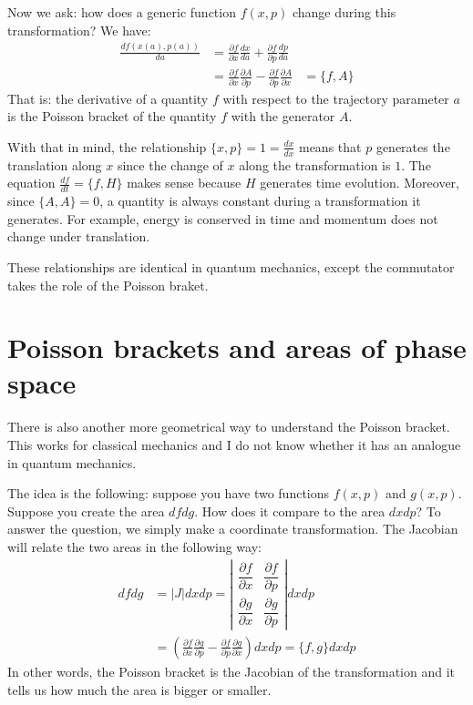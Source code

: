 \documentclass[aps,pra,10pt,floatfix,nofootinbib]{revtex4-1}
\theoremstyle{definition}
\begin{document}
Now we ask: how does a generic function $f(x,p)$ change during this transformation? We have:
\begin{equation}
\begin{aligned}
\frac{df(x(a),p(a))}{da} &= \frac{\partial f}{\partial x}\frac{dx}{da} + \frac{\partial f}{\partial p}\frac{dp}{da} \\
&=\frac{\partial f}{\partial x} \frac{\partial A}{\partial p} - \frac{\partial f}{\partial p}\frac{\partial A}{\partial x}
&=\{f,A\}
\end{aligned}
\label{PoissonGenerator}
\end{equation}
That is: the derivative of a quantity $f$ with respect to the trajectory parameter $a$ is the Poisson bracket of the quantity $f$ with the generator $A$.

With that in mind, the relationship $\{x, p\} = 1 = \frac{dx}{dx}$ means that $p$ generates the translation along $x$ since the change of $x$ along the transformation is $1$. The equation $\frac{df}{dt} = \{f, H\}$ makes sense because $H$ generates time evolution. Moreover, since $\{A, A\} = 0$, a quantity is always constant during a transformation it generates. For example, energy is conserved in time and momentum does not change under translation.

These relationships are identical in quantum mechanics, except the commutator takes the role of the Poisson braket.

\section{Poisson brackets and areas of phase space}

There is also another more geometrical way to understand the Poisson bracket. This works for classical mechanics and I do not know whether it has an analogue in quantum mechanics.

The idea is the following: suppose you have two functions $f(x,p)$ and $g(x,p)$. Suppose you create the area $df dg$. How does it compare to the area $dx dp$? To answer the question, we simply make a coordinate transformation. The Jacobian will relate the two areas in the following way:
\begin{equation}
\begin{aligned}
df dg &= | J | dx dp = \left| \begin{matrix}
\dfrac{\partial f}{\partial x} & \dfrac{\partial f}{\partial p} \\[2.2ex]
\dfrac{\partial g}{\partial x} & \dfrac{\partial g}{\partial p} \end{matrix} \right| dx dp \\
&= \left( \frac{\partial f}{\partial x} \frac{\partial g}{\partial p} - \frac{\partial f}{\partial p}\frac{\partial g}{\partial x} \right) dx dp = \{f,g\} dx dp
\end{aligned}
\label{PoissonJacobian}
\end{equation}
In other words, the Poisson bracket is the Jacobian of the transformation and it tells us how much the area is bigger or smaller.
\end{document}
